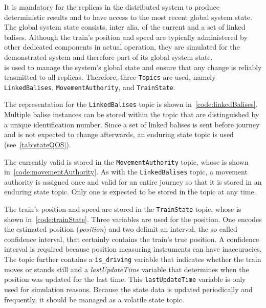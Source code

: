 It is mandatory for the replicas in the distributed system to produce deterministic results and to have access to the most recent global system state.
The global system state consists, inter alia, of the current  and a set of linked balises.
Although the train's position and speed are typically administered by other dedicated components in actual operation, they are simulated for the demonstrated system and therefore part of its global system state.
\\

 is used to manage the system's global state and ensure that any change is reliably trasmitted to all replicas.
Therefore, three \texttt{Topics} are used, namely \texttt{LinkedBalises}, \texttt{MovementAuthority}, and \texttt{TrainState}.

The  representation for the \texttt{LinkedBalises} topic is shown in~\autoref{code:linkedBalises}.
Multiple balise instances can be stored within the topic that are distinguished by a unique identification number.
Since a set of linked balises is sent before journey and is not expected to change afterwards, an enduring  state topic is used (see~\autoref{tab:stateQOS}).

The currently valid  is stored in the \texttt{MovementAuthority} topic, whose  is shown in~\autoref{code:movementAuthority}.
As with the \texttt{LinkedBalises} topic, a movement authority is assigned once and valid for an entire journey so that it is stored in an enduring state topic.
Only one  is expected to be stored in the topic at any time.

The train's position and speed are stored in the \texttt{TrainState} topic, whose  is shown in~\autoref{code:trainState}.
Three variables are used for the position.
One encodes the estimated position (\textit{position}) and two delimit an interval, the so called confidence interval, that certainly contains the train's true position.
A confidence interval is required because position measuring instruments can have inaccuracies.
The topic further contains a \texttt{is\_driving} variable that indicates whether the train moves or stands still and a \textit{lastUpdateTime} variable that determines when the position was updated for the last time.
This \texttt{lastUpdateTime} variable is only used for simulation reasons.
Because the state data is updated periodically and frequently, it should be managed as a volatile  state topic.
\\

